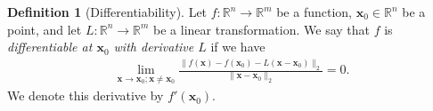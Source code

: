 \documentclass[11pt,letter,notitlepage]{article}
\theoremstyle{definition}
\newtheorem{definition}{Definition}
\begin{document}
	\begin{exercise} 
	
	\begin{definition}[Differentiability]\cite{Tao}\label{def:diff}
	    Let $f:\mathbb{R}^n\rightarrow\mathbb{R}^m$ be a function, $\mathbf{x}_0\in\mathbb{R}^n$ be a point, and let $L:\mathbb{R}^n\rightarrow\mathbb{R}^m$ be a linear transformation. We say that $f$ is \emph{differentiable at $\mathbf{x}_0$ with derivative $L$} if we have
	    \begin{align*}
	        \lim_{\mathbf{x}\rightarrow\mathbf{x}_0;\mathbf{x}\neq\mathbf{x}_0}\frac{\|f(\mathbf{x})-f(\mathbf{x}_0)-L(\mathbf{x}-\mathbf{x}_0)\|_2}{\|\mathbf{x}-\mathbf{x}_0\|_2}=0.
	    \end{align*}
	    We denote this derivative by $f'(\mathbf{x}_0)$.
	\end{definition}
	

\end{exercise}
\end{document}
